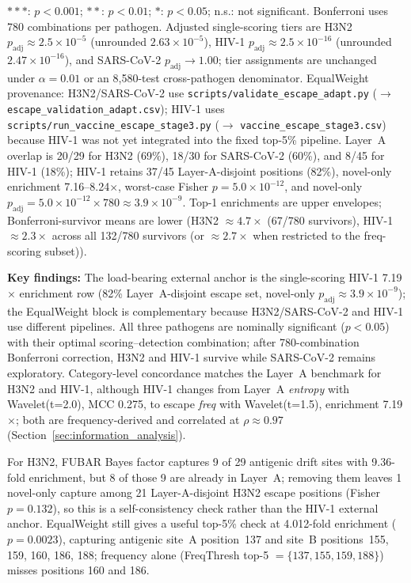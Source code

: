 \begin{table}[htbp]
\begin{minipage}{\textwidth}
\footnotesize $***$: $p < 0.001$; $**$: $p < 0.01$; $*$: $p < 0.05$; n.s.: not significant. Bonferroni uses 780 combinations per pathogen. Adjusted single-scoring tiers are H3N2 $p_{\text{adj}} \approx 2.5 \times 10^{-5}$ (unrounded $2.63 \times 10^{-5}$), HIV-1 $p_{\text{adj}} \approx 2.5 \times 10^{-16}$ (unrounded $2.47 \times 10^{-16}$), and SARS-CoV-2 $p_{\text{adj}} \to 1.00$; tier assignments are unchanged under $\alpha=0.01$ or an 8,580-test cross-pathogen denominator. EqualWeight provenance: H3N2/SARS-CoV-2 use \texttt{scripts/validate\_escape\_adapt.py} ($\to$ \texttt{escape\_validation\_adapt.csv}); HIV-1 uses \texttt{scripts/run\_vaccine\_escape\_stage3.py} ($\to$ \texttt{vaccine\_escape\_stage3.csv}) because HIV-1 was not yet integrated into the fixed top-5\% pipeline. Layer~A overlap is 20/29 for H3N2 (69\%), 18/30 for SARS-CoV-2 (60\%), and 8/45 for HIV-1 (18\%); HIV-1 retains 37/45 Layer-A-disjoint positions (82\%), novel-only enrichment 7.16--8.24$\times$, worst-case Fisher $p = 5.0 \times 10^{-12}$, and novel-only $p_{\text{adj}} = 5.0 \times 10^{-12} \times 780 \approx 3.9 \times 10^{-9}$. Top-1 enrichments are upper envelopes; Bonferroni-survivor means are lower (H3N2 $\approx 4.7\times$ (67/780 survivors), HIV-1 $\approx 2.3\times$ across all 132/780 survivors (or $\approx 2.7\times$ when restricted to the freq-scoring subset)).
\end{minipage}
\end{table}

\textbf{Key findings:}
The load-bearing external anchor is the single-scoring HIV-1 7.19$\times$ enrichment row (82\% Layer~A-disjoint escape set, novel-only $p_{\text{adj}} \approx 3.9 \times 10^{-9}$); the EqualWeight block is complementary because H3N2/SARS-CoV-2 and HIV-1 use different pipelines. All three pathogens are nominally significant ($p < 0.05$) with their optimal scoring--detection combination; after 780-combination Bonferroni correction, H3N2 and HIV-1 survive while SARS-CoV-2 remains exploratory. Category-level concordance matches the Layer~A benchmark for H3N2 and HIV-1, although HIV-1 changes from Layer~A \textit{entropy} with Wavelet(t{=}2.0), MCC 0.275, to escape \textit{freq} with Wavelet(t{=}1.5), enrichment 7.19$\times$; both are frequency-derived and correlated at $\rho \approx 0.97$ (Section~\ref{sec:information_analysis}).

For H3N2, FUBAR Bayes factor captures 9 of 29 antigenic drift sites with 9.36-fold enrichment, but 8 of those 9 are already in Layer~A; removing them leaves 1 novel-only capture among 21 Layer-A-disjoint H3N2 escape positions (Fisher $p = 0.132$), so this is a self-consistency check rather than the HIV-1 external anchor. EqualWeight still gives a useful top-5\% check at 4.012-fold enrichment ($p = 0.0023$), capturing antigenic site~A position~137 and site~B positions~155, 159, 160, 186, 188; frequency alone (FreqThresh top-5 $= \{137, 155, 159, 188\}$) misses positions 160 and 186.

